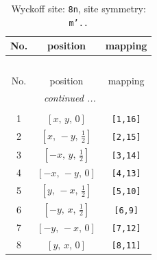 \documentclass[fleqn,8pt]{jsarticle}
\begin{document}
\begin{longtable}{ccc}
\caption{Wyckoff site: {\tt 8n}, site symmetry: {\tt m'..}}
 \\
 \hline \hline
No. & position & mapping \\ \hline \endfirsthead

\multicolumn{2}{l}{\tablename\ \thetable{}} \\
 \hline \hline
No. & position & mapping \\ \hline \endhead

 \hline \hline
\multicolumn{2}{r}{\footnotesize\it continued ...} \\ \endfoot

 \hline \hline
\multicolumn{2}{r}{} \\ \endlastfoot

1 & $\left[ x,\, y,\, 0 \right]$ & {\tt [1,16]} \\ \hline
2 & $\left[ x,\, - y,\, \frac{1}{2} \right]$ & {\tt [2,15]} \\ \hline
3 & $\left[ - x,\, y,\, \frac{1}{2} \right]$ & {\tt [3,14]} \\ \hline
4 & $\left[ - x,\, - y,\, 0 \right]$ & {\tt [4,13]} \\ \hline
5 & $\left[ y,\, - x,\, \frac{1}{2} \right]$ & {\tt [5,10]} \\ \hline
6 & $\left[ - y,\, x,\, \frac{1}{2} \right]$ & {\tt [6,9]} \\ \hline
7 & $\left[ - y,\, - x,\, 0 \right]$ & {\tt [7,12]} \\ \hline
8 & $\left[ y,\, x,\, 0 \right]$ & {\tt [8,11]} \\
\end{longtable}
\renewcommand{\arraystretch}{1.2}
\end{document}

